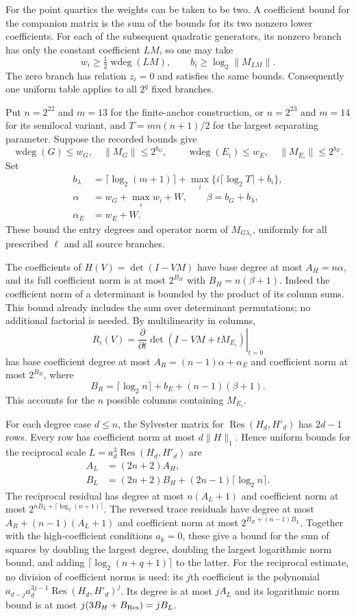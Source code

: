 \documentclass[11pt,a4paper]{article}
\theoremstyle{definition}
\theoremstyle{remark}
\begin{document}
For the point quartics the weights can be taken to be two. A coefficient
bound for the companion matrix is the sum of the bounds for its two
nonzero lower coefficients. For each of the subsequent quadratic
generators, its nonzero branch has only the constant coefficient
$LM$, so one may take
\[
 w_i\ge\tfrac12\operatorname{wdeg}(LM),\qquad
 b_i\ge\log_2\|M_{LM}\|.
\]
The zero branch has relation $z_i=0$ and satisfies the same bounds.
Consequently one uniform table applies to all $2^q$ fixed branches.

Put $n=2^{22}$ and $m=13$ for the finite-anchor construction, or
$n=2^{23}$ and $m=14$ for its semilocal variant, and
$T=m n(n+1)/2$ for the largest separating parameter. Suppose the
recorded bounds give
\[
 \operatorname{wdeg}(G)\le w_G,\quad \|M_G\|\le2^{b_G},\qquad
 \operatorname{wdeg}(E_i)\le w_E,\quad \|M_{E_i}\|\le2^{b_E}.
\]
Set
\begin{align*}
 b_\lambda&=\lceil\log_2(m+1)\rceil
       +\max_i\{i\lceil\log_2 T\rceil+b_i\},\\
 \alpha&=w_G+\max_i w_i+W,\qquad \beta=b_G+b_\lambda,\\
 \alpha_E&=w_E+W.
\end{align*}
These bound the entry degrees and operator norm of
$M_{G\lambda_\ell}$, uniformly for all prescribed $\ell$ and all
source branches.

The coefficients of $H(V)=\det(I-VM)$ have base degree at most
$A_H=n\alpha$, and its full coefficient norm is at most
$2^{B_H}$ with $B_H=n(\beta+1)$. Indeed the coefficient norm of a
determinant is bounded by the product of its column sums. This bound
already includes the sum over determinant permutations; no additional
factorial is needed. By multilinearity in columns,
\[
 R_i(V)=\left.\frac{\partial}{\partial t}
       \det(I-VM+tM_{E_i})\right|_{t=0}
\]
has base coefficient degree at most
$A_R=(n-1)\alpha+\alpha_E$ and coefficient norm at most $2^{B_R}$,
where
\[
 B_R=\lceil\log_2 n\rceil+b_E+(n-1)(\beta+1).
\]
This accounts for the $n$ possible columns containing $M_{E_i}$.

For each degree case $d\le n$, the Sylvester matrix for
$\operatorname{Res}(H_d,H'_d)$ has $2d-1$ rows. Every row has
coefficient norm at most $d\|H\|_1$. Hence uniform bounds for the
reciprocal scale $L=a_d^3\operatorname{Res}(H_d,H'_d)$ are
\begin{align*}
 A_L&=(2n+2)A_H,\\
 B_L&=(2n+2)B_H+(2n-1)\lceil\log_2 n\rceil.
\end{align*}
The reciprocal residual has degree at most $n(A_L+1)$ and coefficient
norm at most $2^{nB_L+\lceil\log_2(n+1)\rceil}$. The reversed trace
residuals have degree at most $A_R+(n-1)(A_L+1)$ and coefficient norm
at most $2^{B_R+(n-1)B_L}$. Together with the high-coefficient
conditions $a_k=0$, these give a bound for the sum of squares by
doubling the largest degree, doubling the largest logarithmic norm
bound, and adding $\lceil\log_2(n+q+1)\rceil$ to the latter.
For the reciprocal estimate, no division of coefficient norms is used:
its $j$th coefficient is the polynomial
$a_{d-j}a_d^{3j-1}\operatorname{Res}(H_d,H'_d)^j$.
Its degree is at most $jA_L$ and its logarithmic norm bound is at most
$j(3B_H+B_{\rm Res})=jB_L$.
\end{document}
